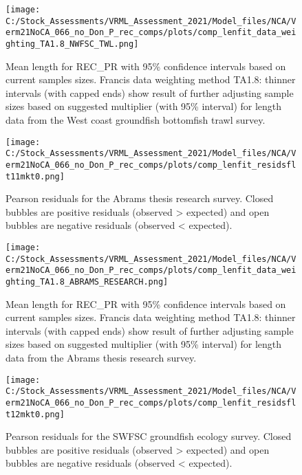 \documentclass[11pt,
  english,
  a4paper,
]{article}
\begin{document}
\begin{figure}
\centering
\texttt{[image: C:/Stock\_Assessments/VRML\_Assessment\_2021/Model\_files/NCA/Verm21NoCA\_066\_no\_Don\_P\_rec\_comps/plots/comp\_lenfit\_data\_weighting\_TA1.8\_NWFSC\_TWL.png]}
\caption{Mean length for REC\_PR with 95\% confidence intervals based on current samples sizes. Francis data weighting method TA1.8: thinner intervals (with capped ends) show result of further adjusting sample sizes based on suggested multiplier (with 95\% interval) for length data from the West coast groundfish bottomfish trawl survey.\label{fig:mean-len-fit-NWFSC-TWL}}
\end{figure}

\begin{figure}
\centering
\texttt{[image: C:/Stock\_Assessments/VRML\_Assessment\_2021/Model\_files/NCA/Verm21NoCA\_066\_no\_Don\_P\_rec\_comps/plots/comp\_lenfit\_residsflt11mkt0.png]}
\caption{Pearson residuals for the Abrams thesis research survey. Closed bubbles are positive residuals (observed \textgreater{} expected) and open bubbles are negative residuals (observed \textless{} expected).\label{fig:len-pearson-ABRAMS-RESEARCH}}
\end{figure}

\begin{figure}
\centering
\texttt{[image: C:/Stock\_Assessments/VRML\_Assessment\_2021/Model\_files/NCA/Verm21NoCA\_066\_no\_Don\_P\_rec\_comps/plots/comp\_lenfit\_data\_weighting\_TA1.8\_ABRAMS\_RESEARCH.png]}
\caption{Mean length for REC\_PR with 95\% confidence intervals based on current samples sizes. Francis data weighting method TA1.8: thinner intervals (with capped ends) show result of further adjusting sample sizes based on suggested multiplier (with 95\% interval) for length data from the Abrams thesis research survey.\label{fig:mean-len-fit-ABRAMS-RESEARCH}}
\end{figure}

\begin{figure}
\centering
\texttt{[image: C:/Stock\_Assessments/VRML\_Assessment\_2021/Model\_files/NCA/Verm21NoCA\_066\_no\_Don\_P\_rec\_comps/plots/comp\_lenfit\_residsflt12mkt0.png]}
\caption{Pearson residuals for the SWFSC groundfish ecology survey. Closed bubbles are positive residuals (observed \textgreater{} expected) and open bubbles are negative residuals (observed \textless{} expected).\label{fig:len-pearson-SWFSC-GF-ECOL}}
\end{figure}
\end{document}
